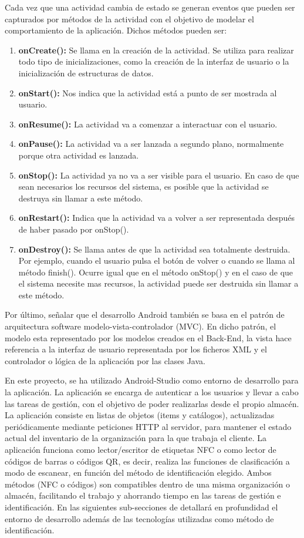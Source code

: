 \documentclass[a4paper,11pt]{book}
\begin{document}
Cada vez que una actividad cambia de estado se generan eventos que pueden ser capturados por métodos de la actividad con el objetivo de modelar el comportamiento de la aplicación. Dichos métodos pueden ser: 
\begin{enumerate}
\item \textbf{onCreate():} Se llama en la creación de la actividad. Se utiliza para realizar todo tipo de inicializaciones, como la creación de la interfaz de usuario o la inicialización de estructuras de datos. 
\item \textbf{onStart():} Nos indica que la actividad está a punto de ser mostrada al usuario.
\item \textbf{onResume():} La actividad va a comenzar a interactuar con el usuario. 
\item \textbf{onPause():} La actividad va a ser lanzada a segundo plano, normalmente porque otra actividad es lanzada. 
\item \textbf{onStop():} La actividad ya no va a ser visible para el usuario. En caso de que sean necesarios los recursos del sistema, es posible que la actividad se destruya sin llamar a este método.
\item \textbf{onRestart():} Indica que la actividad va a volver a ser representada después de haber pasado por onStop().
\item \textbf{onDestroy():} Se llama antes de que la actividad sea totalmente destruida. Por ejemplo, cuando el usuario pulsa el botón de volver o cuando se llama al método finish(). Ocurre igual que en el método onStop() y en el caso de que el sistema necesite mas recursos, la actividad puede ser destruida sin llamar a este método. 
\end{enumerate}

Por último, señalar que el desarrollo Android también se basa en el patrón de arquitectura software modelo-vista-controlador (MVC). En dicho patrón, el modelo esta representado por los modelos creados en el Back-End, la vista hace referencia a la interfaz de usuario representada por los ficheros XML y el controlador o lógica de la aplicación por las clases Java. 


En este proyecto, se ha utilizado Android-Studio como entorno de desarrollo para la aplicación. La aplicación se encarga de autenticar a los usuarios y llevar a cabo las tareas de gestión, con el objetivo de poder realizarlas desde el propio almacén. La aplicación consiste en listas de  objetos (items y catálogos), actualizadas periódicamente mediante peticiones HTTP al servidor, para mantener el estado actual del inventario de la organización para la que trabaja el cliente. La aplicación funciona como lector/escritor de etiquetas NFC o como lector de códigos de barras o códigos QR, es decir, realiza las funciones de clasificación a modo de escanear, en función del método de identificación elegido. Ambos métodos (NFC o códigos) son compatibles dentro de una misma organización o almacén, facilitando el trabajo y ahorrando tiempo en las tareas de gestión e identificación. En las siguientes sub-secciones de detallará en profundidad el entorno de desarrollo además de las tecnologías utilizadas como método de identificación. 
 
\end{document}
